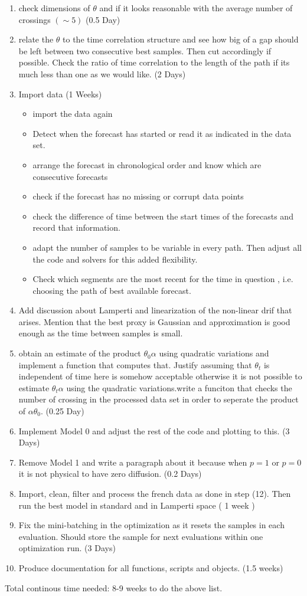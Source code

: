\documentclass[a4paper, 12pt]{article}
\begin{document}
\begin{enumerate}
\item check dimensions of $\theta$ and if it looks reasonable with the average number of crossings $(\sim 5)$ (0.5 Day)
\item relate the $\theta$ to the time correlation structure and see how big of a gap should be left between two consecutive best samples. Then cut accordingly if possible. Check the ratio of time correlation to the length of the path if its much less than one as we would like. (2 Days)
\item Import data (1 Weeks)
\begin{itemize}
\item import the data again
\item Detect when the forecast has started or read it as indicated in the data set.
\item arrange the forecast in chronological order and  know which are consecutive forecasts
\item check if the forecast has no missing or corrupt data points
\item check the difference of time between the start times of the forecasts and record that information.
\item adapt the number of samples to be variable in every path. Then adjust all the code and solvers for this added flexibility.
\item Check which segments are the most recent for the time in question , i.e. choosing the path of best available forecast.
\end{itemize}
\item Add discussion about Lamperti and linearization of the non-linear drif that arises. Mention that the best proxy is Gaussian and approximation is good enough as the time between samples is small. 
\item obtain an estimate of the product $\theta_0 \alpha$ using quadratic variations and implement a function that computes that. Justify assuming that $\theta_t$ is independent of time here is somehow acceptable otherwise it is not possible to estimate $\theta_t \alpha$ using the quadratic variations.write a funciton that checks the number of crossing in the processed data set in order to seperate the product of $\alpha \theta_0$. (0.25 Day)
\item Implement Model 0 and adjust the rest of the code and plotting to this. (3 Days)
\item Remove Model 1 and write a paragraph about it because when $p=1$ or $p=0$ it is not physical to have zero diffusion. (0.2 Days)
\item Import, clean, filter and process the french data as done in step (12). Then run the best model in standard and in Lamperti space ( 1 week )
\item Fix the mini-batching in the optimization as it resets the samples in each evaluation. Should store the sample for next evaluations within one optimization run. (3 Days)
\item Produce documentation for all functions, scripts and objects. (1.5 weeks)
\end{enumerate}
Total continous time needed: 8-9 weeks to do the above list.
\end{document}
